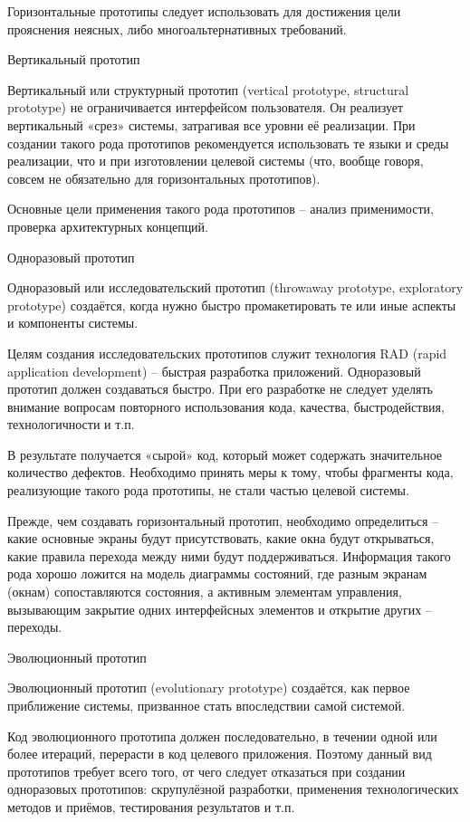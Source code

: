 \documentclass{../industrial-development}
\begin{document}
{Горизонтальные прототипы следует использовать для достижения цели прояснения неясных, либо многоальтернативных требований.

\alert{Вертикальный прототип}

Вертикальный или структурный прототип (vertical prototype, structural prototype) не ограничивается интерфейсом пользователя. Он реализует вертикальный «срез» системы, затрагивая все уровни её реализации. При создании такого рода прототипов рекомендуется использовать те языки и среды реализации, что и при изготовлении целевой системы (что, вообще говоря, совсем не обязательно для горизонтальных прототипов).

Основные цели применения такого рода прототипов – анализ применимости, проверка архитектурных концепций.

\alert{Одноразовый прототип}

Одноразовый или исследовательский прототип (throwaway prototype, exploratory prototype) создаётся, когда нужно быстро промакетировать те или иные аспекты и компоненты системы.

Целям создания исследовательских прототипов служит технология RAD (rapid application development) – быстрая разработка приложений. Одноразовый прототип должен создаваться быстро. При его разработке не следует уделять внимание вопросам повторного использования кода, качества, быстродействия, технологичности и т.п.

В результате получается «сырой» код, который может содержать значительное количество дефектов. Необходимо принять меры к тому, чтобы фрагменты кода, реализующие такого рода прототипы, не стали частью целевой системы.

Прежде, чем создавать горизонтальный прототип, необходимо определиться – какие основные экраны будут присутствовать, какие окна
будут открываться, какие правила перехода между ними будут поддерживаться. Информация такого рода хорошо ложится на модель диаграммы состояний, где разным экранам (окнам) сопоставляются состояния, а активным элементам управления, вызывающим закрытие одних интерфейсных элементов и открытие других – переходы.

\alert{Эволюционный прототип}

Эволюционный прототип (evolutionary prototype) создаётся, как первое приближение системы, призванное стать впоследствии самой системой.

Код эволюционного прототипа должен последовательно, в течении одной или более итераций, перерасти в код целевого приложения. Поэтому данный вид прототипов требует всего того, от чего следует отказаться при создании одноразовых прототипов: скрупулёзной разработки, применения технологических методов и приёмов, тестирования результатов и т.п.

}
\end{document}
